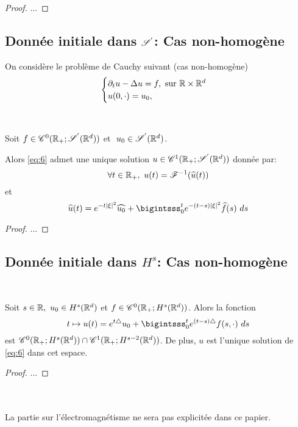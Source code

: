 \documentclass[french,a4paper,10pt]{article}
\begin{document}
            \begin{proof}
                ...
            \end{proof}

        \subsection{Donnée initiale dans $\mathscr{S}^{'}$: Cas non-homogène}\label{subsec:3.4}

             On considère le problème de Cauchy suivant (cas non-homogène)
                \begin{equation}\label{eq:6}
                    \begin{cases}
                        \mathop{}\!{\partial}_tu- \Delta u = f, \text{ sur } \mathbb{R} \times \mathbb{R}^d\\
                        u(0,\cdot) = u_0,
                    \end{cases}
                \end{equation}

            \begin{theorem}\label{thm:3.4.1}~

                Soit $f \in \mathscr{C}^0(\mathbb{R}_+;\mathscr{S}^{'}(\mathbb{R}^d))$ et $\ u_0 \in \mathscr{S}^{'}(\mathbb{R}^d)$.
                
                Alors \eqref{eq:6} admet une unique solution $u \in \mathscr{C}^1(\mathbb{R}_+;\mathscr{S}^{'}(\mathbb{R}^d))$ donnée par:
                \begin{equation*}
                     \forall t \in \R_+, \ u(t)=\scrF^{-1}(\widehat{u}(t))
                \end{equation*}
                et
                \begin{equation*}
                    \widehat{u}(t) = e^{-t\n{\xi}^2}\widehat{u_0} + \bigintsss_0^t e^{-(t-s)\n{\xi}^2}\widehat{f}(s) \ ds
                \end{equation*}
            \end{theorem}

            \begin{proof}
                ...
            \end{proof}

        \subsection{Donnée initiale dans $H^s$: Cas non-homogène}\label{subsec:3.5}

            \begin{theorem}\label{3.5.1}~
            
                Soit $s \in \mathbb{R}, \ u_0 \in H^s(\mathbb{R}^d)$ et $f\in \mathscr{C}^0(\mathbb{R}_+;H^s(\mathbb{R}^d))$. Alors la fonction
                \begin{equation*}
                    t \mapsto u(t) = \et u_0 + \bigintsss_0^t e^{(t-s)\triangle}f(s,\cdot) \ ds
                \end{equation*}
                est $\mathscr{C}^0(\mathbb{R}_+;H^s(\mathbb{R}^d))\cap \mathscr{C}^1(\mathbb{R}_+;H^{s-2}(\mathbb{R}^d))$. De plus, $u$ est l'unique solution de \eqref{eq:6} dans cet espace.
            \end{theorem}

            \begin{proof}
                ...
            \end{proof}
    ~\\ ~\\
    La partie sur l'électromagnétisme ne sera pas explicitée dans ce papier.
\end{document}

